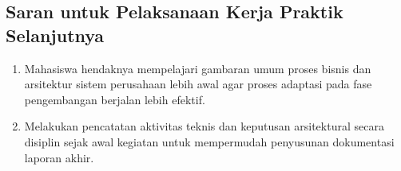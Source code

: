 \subsection{Saran untuk Pelaksanaan Kerja Praktik Selanjutnya}
\begin{enumerate}[label=\arabic*)]
  \item Mahasiswa hendaknya mempelajari gambaran umum proses bisnis dan arsitektur sistem perusahaan lebih awal agar proses adaptasi pada fase pengembangan berjalan lebih efektif.
  \item Melakukan pencatatan aktivitas teknis dan keputusan arsitektural secara disiplin sejak awal kegiatan untuk mempermudah penyusunan dokumentasi laporan akhir.
\end{enumerate}
